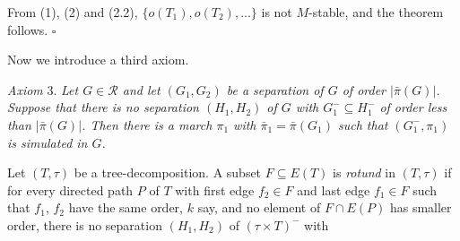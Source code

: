 From (1), (2) and (2.2), $\{o(T_1), o(T_2), ...\}$ is not $M$-stable, and the theorem follows. $\square$


Now we introduce a third axiom.

\textit{Axiom} 3. \textit{Let $G \in \mathscr{R}$ and let $(G_1, G_2)$ be a separation of $G$ of order $|\bar{\pi}(G)|$. Suppose that there is no separation $(H_1, H_2)$ of $G$ with $G_1^- \subseteq H_1^-$ of order less than $|\bar{\pi}(G)|$. Then there is a march $\pi_1$ with $\bar{\pi}_1 = \bar{\pi}(G_1)$ such that $(G_1^-, \pi_1)$ is simulated in $G$.}

Let $(T, \tau)$ be a tree-decomposition. A subset $F \subseteq E(T)$ is \textit{rotund} in $(T, \tau)$ if for every directed path $P$ of $T$ with first edge $f_2 \in F$ and last edge $f_1 \in F$ such that $f_1$, $f_2$ have the same order, $k$ say, and no element of $F \cap E(P)$ has smaller order, there is no separation $(H_1, H_2)$ of $(\tau \times T)^-$ with
